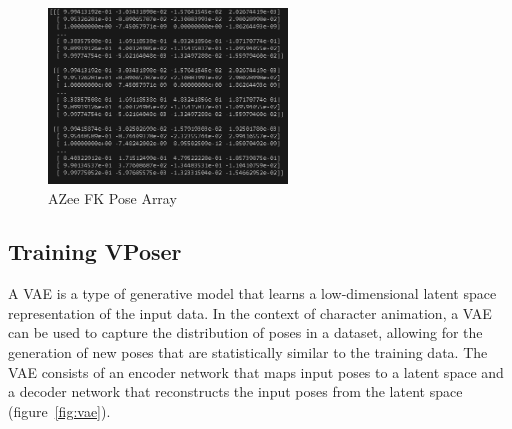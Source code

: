 \documentclass[../../main.tex]{subfiles}
\begin{document}
\begin{figure}
  \centering \includegraphics[width = 2.5in]{chapters/pose_correction/images/azee_fk_pose.png}
  \caption{AZee FK Pose Array}
  \label{fig:azee_fk_pose}
\end{figure}

\subsection{Training VPoser}
\label{ch:pose_correction:pose_correction_with_azee:training}

A VAE is a type of generative model that learns a low-dimensional latent space representation of the input data. In the context of character animation, a VAE can be used to capture the distribution of poses in a dataset, allowing for the generation of new poses that are statistically similar to the training data. The VAE consists of an encoder network that maps input poses to a latent space and a decoder network that reconstructs the input poses from the latent space (figure~\ref{fig:vae}).
\end{document}
